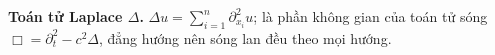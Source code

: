 \textbf{Toán tử Laplace $\Delta$.}
$\Delta u = \sum_{i=1}^{n}\partial_{x_i}^2 u$; là phần không gian của toán tử sóng $\Box=\partial_t^2-c^2\Delta$, đẳng hướng nên sóng lan đều theo mọi hướng.
